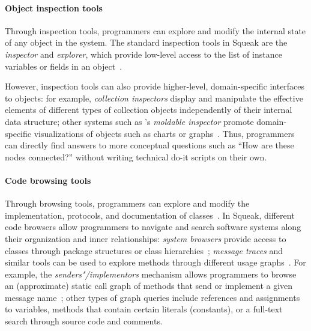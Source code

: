 	\paragraph{Object inspection tools}
	\label{par:background/expsys/tools/inspection}
	Through inspection tools, programmers can explore and modify the internal state of any object in the system.
	The standard inspection tools in Squeak are the \emph{inspector} and \emph{explorer}, which provide low-level access to the list of instance variables or fields in an object~\cites[chap.~8]{goldberg1984smalltalk}[sec.~6.3]{thiede2023squeak}.

	However, inspection tools can also provide higher-level, domain-specific interfaces to objects:
	for example, \emph{collection inspectors} display and manipulate the effective elements of different types of collection objects independently of their internal data structure; other systems such as 's \emph{moldable inspector} promote domain-specific visualizations of objects such as charts or graphs~\cite{chis2015moldable}.
	Thus, programmers can directly find answers to more conceptual questions such as ``How are these nodes connected?'' without writing technical do-it scripts on their own.

	\paragraph{Code browsing tools}
	\label{par:background/expsys/tools/browsing}
	Through browsing tools, programmers can explore and modify the implementation, protocols, and documentation of classes~\cite[sec.~6.2]{thiede2023squeak}.
	In Squeak, different code browsers allow programmers to navigate and search software systems along their organization and inner relationships:
	\emph{system browsers} provide access to classes through package structures or class hierarchies~\cite[chap.~9]{goldberg1984smalltalk}; \emph{message traces} and similar tools can be used to explore methods through different usage graphs~\cite[chap.~10]{goldberg1984smalltalk}.
	For example, the \emph{senders"/implementors} mechanism allows programmers to browse an (approximate\footnotemark) static call graph of methods that send or implement a given message name~\cite{thiede2022augmenting}; other types of graph queries include references and assignments to variables, methods that contain certain literals (constants), or a full-text search through source code and comments.

